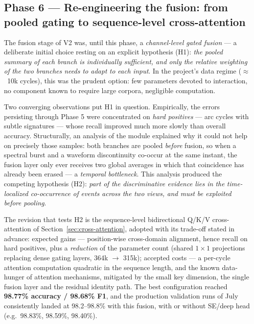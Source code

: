 \subsection{Phase 6 --- Re-engineering the fusion: from pooled gating to sequence-level cross-attention}
\label{sec:phase6}

The fusion stage of V2 was, until this phase, a \emph{channel-level gated fusion} --- a deliberate initial choice resting on an explicit hypothesis (H1): \emph{the pooled summary of each branch is individually sufficient, and only the relative weighting of the two branches needs to adapt to each input}. In the project's data regime ($\approx$~10k cycles), this was the prudent option: few parameters devoted to interaction, no component known to require large corpora, negligible computation.

\medskip

Two converging observations put H1 in question. Empirically, the errors persisting through Phase 5 were concentrated on \emph{hard positives} --- arc cycles with subtle signatures --- whose recall improved much more slowly than overall accuracy. Structurally, an analysis of the module explained why it could not help on precisely those samples: both branches are pooled \emph{before} fusion, so when a spectral burst and a waveform discontinuity co-occur at the same instant, the fusion layer only ever receives two global averages in which that coincidence has already been erased --- a \emph{temporal bottleneck}. This analysis produced the competing hypothesis (H2): \emph{part of the discriminative evidence lies in the time-localized co-occurrence of events across the two views, and must be exploited before pooling}.

\medskip

The revision that tests H2 is the sequence-level bidirectional Q/K/V cross-attention of Section~\ref{sec:cross-attention}, adopted with its trade-off stated in advance: expected gains --- position-wise cross-domain alignment, hence recall on hard positives, plus a \emph{reduction} of the parameter count (shared $1{\times}1$ projections replacing dense gating layers, 364k $\to$ 315k); accepted costs --- a per-cycle attention computation quadratic in the sequence length, and the known data-hunger of attention mechanisms, mitigated by the small key dimension, the single fusion layer and the residual identity path. The best configuration reached \textbf{98.77\% accuracy / 98.68\% F1}, and the production validation runs of July consistently landed at 98.2--98.8\% with this fusion, with or without SE/deep head (e.g.\ 98.83\%, 98.59\%, 98.40\%).

